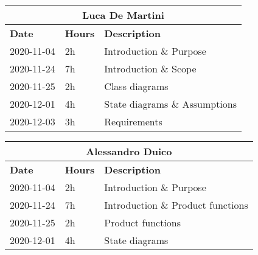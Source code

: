 
\begin{table}[H]
    \centering
    \begin{tabular}{|l|l|l|}
        \multicolumn{3}{c}{\textbf{Luca De Martini}}\\
        \hline
        \textbf{Date} & \textbf{Hours} & \textbf{Description}    \\\hline
        2020-11-04    & 2h             & Introduction \& Purpose \\\hline
        2020-11-24    & 7h             & Introduction \& Scope \\\hline
        2020-11-25    & 2h             & Class diagrams \\\hline
        2020-12-01    & 4h             & State diagrams \& Assumptions \\\hline
        2020-12-03    & 3h             & Requirements \\\hline
    \end{tabular}
\end{table}
\begin{table}[H]
    \centering
    \begin{tabular}{|l|l|l|}
        \multicolumn{3}{c}{\textbf{Alessandro Duico}}\\
        \hline
        \textbf{Date} & \textbf{Hours} & \textbf{Description}    \\\hline
        2020-11-04    & 2h             & Introduction \& Purpose \\\hline
        2020-11-24    & 7h             & Introduction \& Product functions \\\hline
        2020-11-25    & 2h             & Product functions \\\hline
        2020-12-01    & 4h             & State diagrams \\\hline
    \end{tabular}
\end{table}